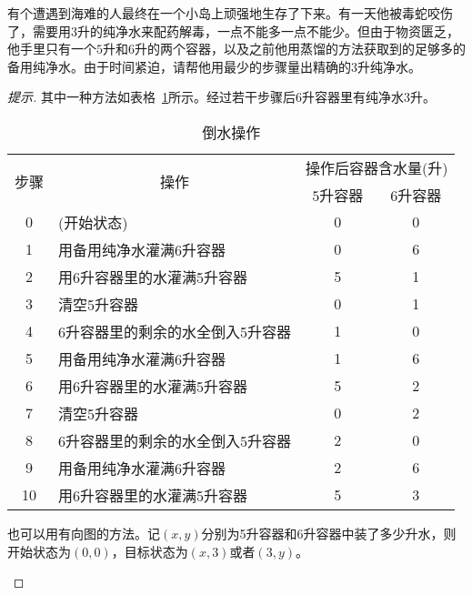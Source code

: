 \begin{example}
  有个遭遇到海难的人最终在一个小岛上顽强地生存了下来。有一天他被毒蛇咬伤了，需要用$3$升的纯净水来配药解毒，一点不能多一点不能少。但由于物资匮乏，他手里只有一个$5$升和$6$升的两个容器，以及之前他用蒸馏的方法获取到的足够多的备用纯净水。由于时间紧迫，请帮他用最少的步骤量出精确的$3$升纯净水。
\end{example}
\begin{proof}[提示]
  其中一种方法如表格~\ref{tab:water-ops}所示。经过若干步骤后6升容器里有纯净水3升。
  \begin{table}[htbp]
    \centering
    \caption{倒水操作}
    \label{tab:water-ops}
    \renewcommand*{\arraystretch}{1.0}
    \begin{tabular}{clcc}
      \toprule[1.5pt]
      \multirow{2}{*}{步骤} & \multicolumn{1}{c}{\multirow{2}{*}{操作}} & \multicolumn{2}{c}{操作后容器含水量(升)} \\
      \cline{3-4}
           &      & $5$升容器 & $6$升容器 \\
      \midrule[1pt]
      0 & (开始状态)                       & 0 & 0\\
      \midrule[1pt]
      1 & 用备用纯净水灌满6升容器          & 0 & 6\\
      2 & 用6升容器里的水灌满5升容器       & 5 & 1\\
      3 & 清空5升容器                      & 0 & 1\\
      4 & 6升容器里的剩余的水全倒入5升容器 & 1 & 0\\
      5 & 用备用纯净水灌满6升容器          & 1 & 6\\
      6 & 用6升容器里的水灌满5升容器       & 5 & 2\\
      7 & 清空5升容器                      & 0 & 2\\
      8 & 6升容器里的剩余的水全倒入5升容器 & 2 & 0\\
      9 & 用备用纯净水灌满6升容器          & 2 & 6\\
     10 & 用6升容器里的水灌满5升容器       & 5 & 3\\
      \bottomrule[1.5pt]
    \end{tabular}
  \end{table}

  也可以用有向图的方法。记$(x,y)$分别为5升容器和6升容器中装了多少升水，则开始状态为$(0,0)$，目标状态为$(x,3)$或者$(3,y)$。
  \begin{center}\tiny
\end{center}
\end{proof}
